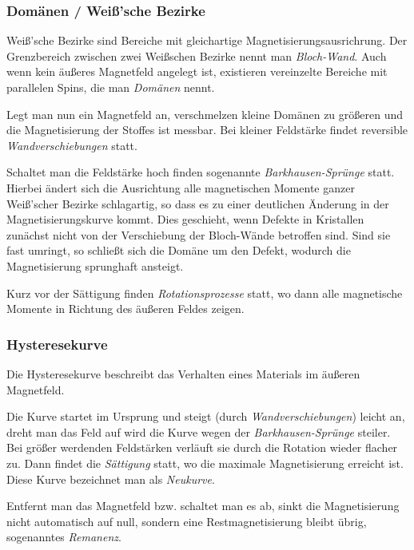\documentclass[12pt,a4paper]{scrartcl}
\numberwithin{equation}{section} %
\renewcommand{\[}{} %
\renewcommand{\]}{\noindent} %
\begin{document}
\hypertarget{domuxe4nen-weiuxdfsche-bezirke}{%
\subsubsection{Domänen / Weiß'sche
Bezirke}\label{domuxe4nen-weiuxdfsche-bezirke}}

Weiß'sche Bezirke sind Bereiche mit gleichartige
Magnetisierungsausrichrung. Der Grenzbereich zwischen zwei Weißschen
Bezirke nennt man \emph{Bloch-Wand}. Auch wenn kein äußeres Magnetfeld
angelegt ist, existieren vereinzelte Bereiche mit parallelen Spins, die
man \emph{Domänen} nennt.

Legt man nun ein Magnetfeld an, verschmelzen kleine Domänen zu größeren
und die Magnetisierung der Stoffes ist messbar. Bei kleiner Feldstärke
findet reversible \emph{Wandverschiebungen} statt.

Schaltet man die Feldstärke hoch finden sogenannte
\emph{Barkhausen-Sprünge} statt. Hierbei ändert sich die Ausrichtung
alle magnetischen Momente ganzer Weiß'scher Bezirke schlagartig, so dass
es zu einer deutlichen Änderung in der Magnetisierungskurve kommt. Dies
geschieht, wenn Defekte in Kristallen zunächst nicht von der
Verschiebung der Bloch-Wände betroffen sind. Sind sie fast umringt, so
schließt sich die Domäne um den Defekt, wodurch die Magnetisierung
sprunghaft ansteigt.

Kurz vor der Sättigung finden \emph{Rotationsprozesse} statt, wo dann
alle magnetische Momente in Richtung des äußeren Feldes zeigen.

\hypertarget{hysteresekurve}{%
\subsubsection{Hysteresekurve}\label{hysteresekurve}}

Die Hysteresekurve beschreibt das Verhalten eines Materials im äußeren
Magnetfeld.

Die Kurve startet im Ursprung und steigt (durch
\emph{Wandverschiebungen}) leicht an, dreht man das Feld auf wird die
Kurve wegen der \emph{Barkhausen-Sprünge} steiler. Bei größer werdenden
Feldstärken verläuft sie durch die Rotation wieder flacher zu. Dann
findet die \emph{Sättigung} statt, wo die maximale Magnetisierung
erreicht ist. Diese Kurve bezeichnet man als \emph{Neukurve}.

Entfernt man das Magnetfeld bzw. schaltet man es ab, sinkt die
Magnetisierung nicht automatisch auf null, sondern eine
Restmagnetisierung bleibt übrig, sogenanntes \emph{Remanenz}.
\end{document}
